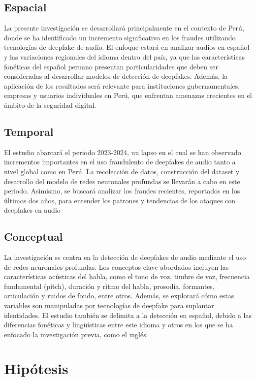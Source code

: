 \subsection{Espacial}
La presente investigación se desarrollará principalmente en el contexto de Perú, donde se ha identificado un incremento significativo en los fraudes utilizando tecnologías de deepfake de audio. El enfoque estará en analizar audios en español y las variaciones regionales del idioma dentro del país, ya que las características fonéticas del español peruano presentan particularidades que deben ser consideradas al desarrollar modelos de detección de deepfakes. Además, la aplicación de los resultados será relevante para instituciones gubernamentales, empresas y usuarios individuales en Perú, que enfrentan amenazas crecientes en el ámbito de la seguridad digital.

\subsection{Temporal}
El estudio abarcará el periodo 2023-2024, un lapso en el cual se han observado incrementos importantes en el uso fraudulento de deepfakes de audio tanto a nivel global como en Perú. La recolección de datos, construcción del dataset y desarrollo del modelo de redes neuronales profundas se llevarán a cabo en este periodo. Asimismo, se buscará analizar los fraudes recientes, reportados en los últimos dos años, para entender los patrones y tendencias de los ataques con deepfakes en audio 

\subsection{Conceptual}
La investigación se centra en la detección de deepfakes de audio mediante el uso de redes neuronales profundas. Los conceptos clave abordados incluyen las características acústicas del habla, como el tono de voz, timbre de voz, frecuencia fundamental (pitch), duración y ritmo del habla, prosodia, formantes, articulación y ruidos de fondo, entre otros. Además, se explorará cómo estas variables son manipuladas por tecnologías de deepfake para suplantar identidades. El estudio también se delimita a la detección en español, debido a las diferencias fonéticas y lingüísticas entre este idioma y otros en los que se ha enfocado la investigación previa, como el inglés. 

\section{Hipótesis}

